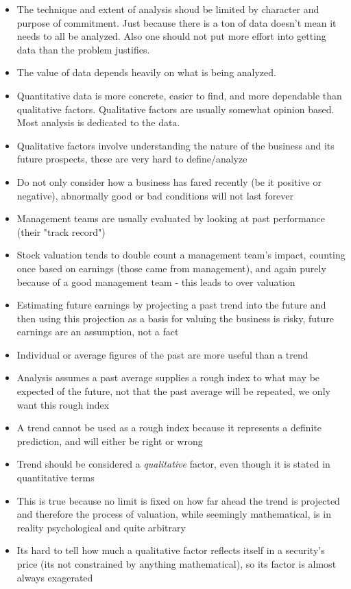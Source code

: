 \documentclass{article}
\begin{document}
\begin{itemize}
\item The technique and extent of analysis shoud be limited by character and purpose of commitment. Just because there is a ton of data doesn't mean it needs to all be analyzed. Also one should not put more effort into getting data than the problem justifies.
\item The value of data depends heavily on what is being analyzed.
\item Quantitative data is more concrete, easier to find, and more dependable than qualitative factors. Qualitative factors are usually somewhat opinion based. Most analysis is dedicated to the data.
\item Qualitative factors involve understanding the nature of the business and its future prospects, these are very hard to define/analyze
\item Do not only consider how a business has fared recently (be it positive or negative), abnormally good or bad conditions will not last forever
\item Management teams are usually evaluated by looking at past performance (their "track record")
\item Stock valuation tends to double count a management team's impact, counting once based on earnings (those came from management), and again purely because of a good management team - this leads to over valuation
\item Estimating future earnings by projecting a past trend into the future and then using this projection as a basis for valuing the business is risky, future earnings are an assumption, not a fact
\item Individual or average figures of the past are more useful than a trend
\item Analysis assumes a past average supplies a rough index to what may be expected of the future, not that the past average will be repeated, we only want this rough index
\item A trend cannot be used as a rough index because it represents a definite prediction, and will either be right or wrong
\item Trend should be considered a \textit{qualitative} factor, even though it is stated in quantitative terms
\item This is true because no limit is fixed on how far ahead the trend is projected and therefore the process of valuation, while seemingly mathematical, is in reality psychological and quite arbitrary
\item Its hard to tell how much a qualitative factor reflects itself in a security's price (its not constrained by anything mathematical), so its factor is almost always exagerated

\end{itemize}
\end{document}
